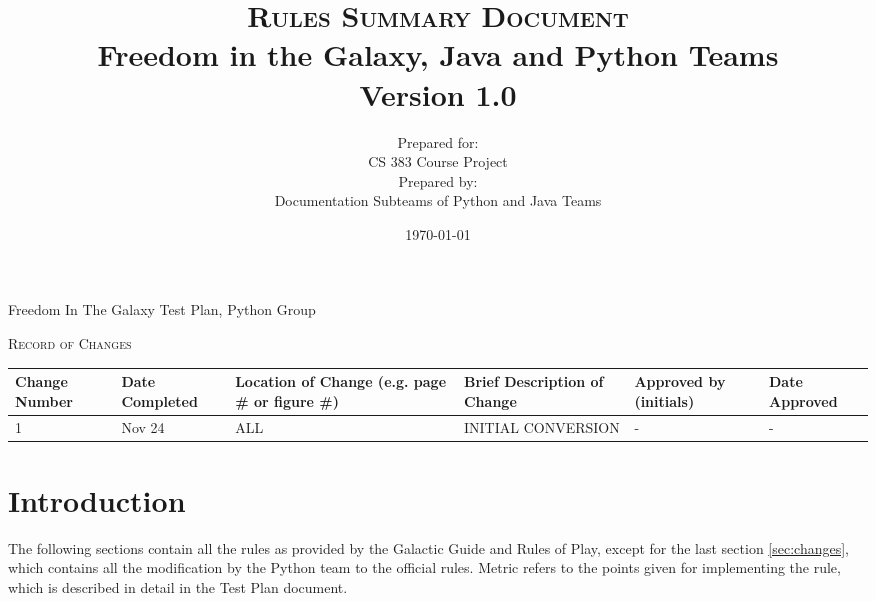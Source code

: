 \documentclass[a4wide]{article}
\begin{document}
\title{\textsc{Rules Summary Document}
  \\ Freedom in the Galaxy, Java and Python Teams
  \vspace{10 mm}
  \\ Version 1.0
  \vspace{10 mm}}
  
\date{\today}

\author{Prepared for:
  \\ CS 383 Course Project
  \vspace{10 mm}
  \\Prepared by:
  \\ Documentation Subteams of Python and Java Teams 
  \vspace{10 mm}}
  
\maketitle
\newpage
  
\begin{center}
\noindent Freedom In The Galaxy Test Plan, Python Group

\vspace{10 mm}

\noindent \textsc{Record of Changes}   

\vspace{10 mm}


\begin{tabularx}{\textwidth}{| X | X | X | X | X | X |}
  \hline
  \textbf{Change Number} &
    \textbf{Date Completed} &
    \textbf{Location of Change (e.g. page \# or figure \#)} &
    \textbf{Brief Description of Change} &
    \textbf{Approved by (initials)} &
    \textbf{Date Approved} 
    \\ \hline 1 & Nov 24 & ALL  & INITIAL CONVERSION & - & -
    \\ \hline
\end{tabularx}
\end{center}
\newpage 
\tableofcontents
\newpage

\section{Introduction}

The following sections contain all the rules as provided by the Galactic Guide and Rules of Play, except for the last section \ref{sec:changes}, which contains all the modification by the Python team to the official rules. Metric refers to the points given for implementing the rule, which is described in detail in the Test Plan document.
\end{document}
